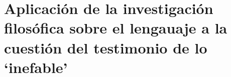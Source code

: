 %


%

\setcounter{subsubsection}{1}
%

\setcounter{subsubsection}{2}
%

\setcounter{subsubsection}{3}
%

\setcounter{subsubsection}{4}
%


\section{Aplicación de la investigación filosófica sobre el lengauaje a la cuestión del testimonio de lo `inefable'}




%

%

